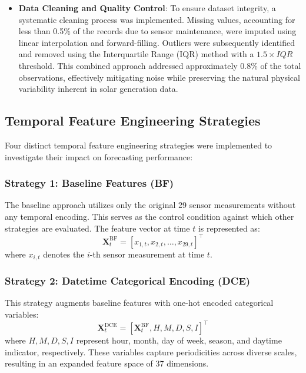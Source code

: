 \documentclass[conference]{IEEEtran}
\begin{document}
\begin{itemize}
\begin{itemize}
	\end{itemize}
	\item \textbf{Data Cleaning and Quality Control}: To ensure dataset integrity, a systematic cleaning process was implemented. Missing values, accounting for less than 0.5\% of the records due to sensor maintenance, were imputed using linear interpolation and forward-filling. Outliers were subsequently identified and removed using the Interquartile Range (IQR) method with a $1.5 \times IQR$ threshold. This combined approach addressed approximately 0.8\% of the total observations, effectively mitigating noise while preserving the natural physical variability inherent in solar generation data.
\end{itemize}

\subsection{Temporal Feature Engineering Strategies}
Four distinct temporal feature engineering strategies were implemented to investigate their impact on forecasting performance:

\subsubsection{Strategy 1: Baseline Features (BF)}
The baseline approach utilizes only the original 29 sensor measurements without any temporal encoding. This serves as the control condition against which other strategies are evaluated. The feature vector at time $t$ is represented as:
\begin{equation}
\mathbf{X}_t^{\text{BF}} = [x_{1,t}, x_{2,t}, \ldots, x_{29,t}]^\top
\end{equation}
where $x_{i,t}$ denotes the $i$-th sensor measurement at time $t$.

\subsubsection{Strategy 2: Datetime Categorical Encoding (DCE)}
This strategy augments baseline features with one-hot encoded categorical variables:
\begin{equation}
	\mathbf{X}_t^{\text{DCE}} = [\mathbf{X}_t^{\text{BF}}, H, M, D, S, I]^\top
\end{equation}
where $H, M, D, S, I$ represent hour, month, day of week, season, and daytime indicator, respectively. These variables capture periodicities across diverse scales, resulting in an expanded feature space of 37 dimensions.
\end{document}
